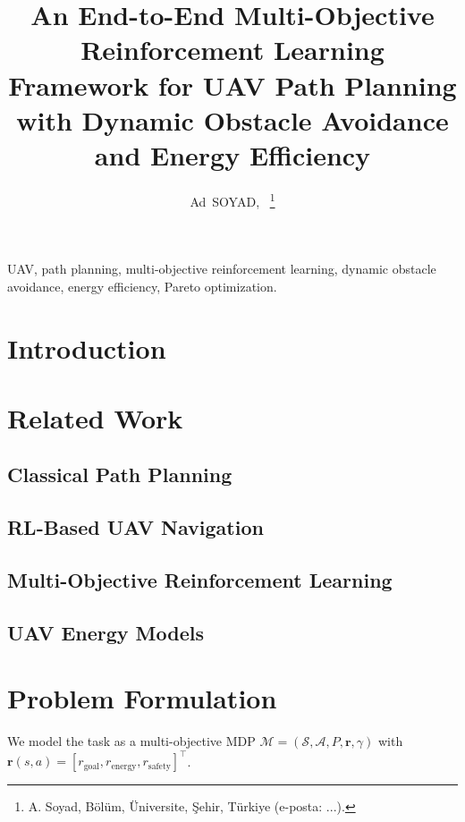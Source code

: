 \documentclass[journal]{IEEEtran}
\begin{document}
\title{An End-to-End Multi-Objective Reinforcement Learning Framework for
UAV Path Planning with Dynamic Obstacle Avoidance and Energy Efficiency}

\author{Ad~SOYAD,~\IEEEmembership{}%
\thanks{A. Soyad, Bölüm, Üniversite, Şehir, Türkiye (e-posta: ...).}}

\maketitle

\begin{abstract}
\end{abstract}

\begin{IEEEkeywords}
UAV, path planning, multi-objective reinforcement learning, dynamic obstacle
avoidance, energy efficiency, Pareto optimization.
\end{IEEEkeywords}

\section{Introduction}

\section{Related Work}
\subsection{Classical Path Planning}
\subsection{RL-Based UAV Navigation}
\subsection{Multi-Objective Reinforcement Learning}
\subsection{UAV Energy Models}

\section{Problem Formulation}
We model the task as a multi-objective MDP
$\mathcal{M}=(\mathcal{S},\mathcal{A},P,\mathbf{r},\gamma)$ with
$\mathbf{r}(s,a)=[r_{\text{goal}},r_{\text{energy}},r_{\text{safety}}]^\top$.
\end{document}

